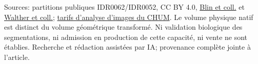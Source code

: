 \documentclass[10pt,a4paper]{article}
\newcommand{\source}[2]{\href{#1}{#2}}
\begin{document}
{\footnotesize\color{slate}Sources: partitions publiques IDR0062/IDR0052, CC BY 4.0, \source{https://idr.openmicroscopy.org/study/idr0062/}{Blin et coll.} et \source{https://idr.openmicroscopy.org/study/idr0052/}{Walther et coll.}; \source{https://www.chumontreal.qc.ca/en/crchum/core-facilities-and-services/cellular-imaging/rates}{tarifs d'analyse d'images du CHUM}. Le volume physique natif est distinct du volume géométrique transformé. Ni validation biologique des segmentations, ni admission en production de cette capacité, ni vente ne sont établies. Recherche et rédaction assistées par IA; provenance complète jointe à l'article.}
\end{document}
